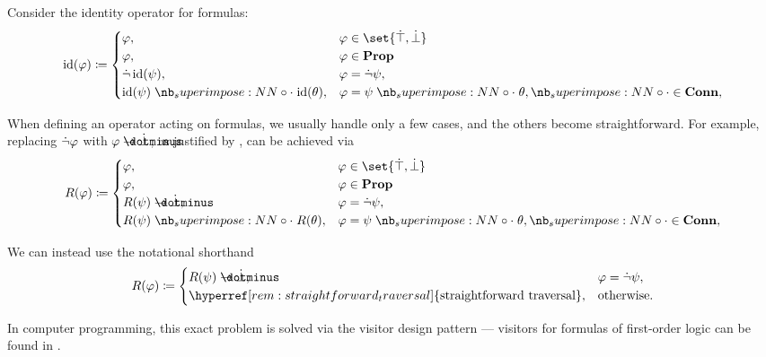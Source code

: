 \begin{remark}\label{rem:straightforward_traversal}
  Consider the identity operator for formulas:
  \begin{equation*}
    \begin{aligned}
      \id(\varphi) \coloneqq \begin{cases}
        \varphi,                        &\varphi \in \set{ \syntop, \synbot } \\
        \varphi,                        &\varphi \in \op*{Prop} \\
        \synneg \id(\psi),              &\varphi = \synneg \psi, \\
        \id(\psi) \syncirc \id(\theta), &\varphi = \psi \syncirc \theta, {\syncirc} \in \op*{Conn}, \\
      \end{cases}
    \end{aligned}
  \end{equation*}

  When defining an operator acting on formulas, we usually handle only a few cases, and the others become straightforward. For example, replacing \( \dot\neg \varphi \) with \( \varphi \synimplies \synbot \), as justified by , can be achieved via
  \begin{equation*}
    \begin{aligned}
      R(\varphi) \coloneqq \begin{cases}
        \varphi,                     &\varphi \in \set{ \syntop, \synbot } \\
        \varphi,                     &\varphi \in \op*{Prop} \\
        R(\psi) \synimplies \synbot, &\varphi = \synneg \psi, \\
        R(\psi) \syncirc R(\theta),  &\varphi = \psi \syncirc \theta, {\syncirc} \in \op*{Conn}, \\
      \end{cases}
    \end{aligned}
  \end{equation*}

  We can instead use the notational shorthand
  \begin{equation*}
    \begin{aligned}
      R(\varphi) \coloneqq \begin{cases}
        R(\psi) \synimplies \synbot,                                             &\varphi = \synneg \psi, \\
        \hyperref[rem:straightforward_traversal]{\T{straightforward traversal}}, &\T{otherwise.}
      \end{cases}
    \end{aligned}
  \end{equation*}

  In computer programming, this exact problem is solved via the visitor design pattern --- visitors for formulas of first-order logic can be found in \cite{notebook:code}.
\end{remark}

